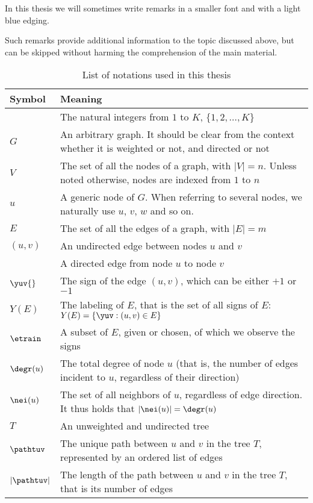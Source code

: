 In this thesis we will sometimes write remarks in a smaller font and with a light blue edging.
\begin{aside}
  Such remarks provide additional information to the topic discussed above, but can be skipped
  without harming the comprehension of the main material.
\end{aside}

\begin{table*}[thpb]
  \centering
  \caption{List of notations used in this thesis}\label{tab:notations}%
  \vspace{-.5\baselineskip}
  \begin{tabulary}{187mm}{LL}
    \toprule
    Symbol & Meaning \\
    \midrule
    \rangek{} & The natural integers from $1$ to $K$, \ie{} $\{1, 2, \ldots, K \}$ \\
    $G$ & An arbitrary graph. It should be clear from the context whether it is weighted or not, and directed or not \\
    $V$ & The set of all the nodes of a graph, with $|V|=n$. Unless noted otherwise, nodes are indexed from $1$ to $n$ \\
    $u$ & A generic node of $G$. When referring to several nodes, we naturally use $u$, $v$, $w$ and so on. \\
    $E$ & The set of all the edges of a graph, with $|E|=m$ \\
    $(u,v)$ & An undirected edge between nodes $u$ and $v$ \\
    \euv{} & A directed edge from node $u$ to node $v$ \\
    $\yuv{}$ & The sign of the edge $(u,v)$, which can be either $+1$ or $-1$ \\
    $Y(E)$ & The labeling of $E$, that is the set of all signs of $E$: $Y(E) = \{\yuv : (u,v)\in E\}$ \\
    $\etrain$ & A subset of $E$, given or chosen, of which we observe the signs \\
    $\degr(u)$ & The total degree of node $u$ (that is, the number of edges incident to $u$,
    regardless of their direction) \\
    $\nei(u)$ & The set of all neighbors of $u$, regardless of edge direction. It thus holds
    that $|\nei(u)| = \degr(u)$ \\
    $T$ & An unweighted and undirected tree \\
    $\pathtuv$ & The unique path between $u$ and $v$ in the tree $T$, represented by an ordered list of edges \\
    $|\pathtuv|$ & The length of the path between $u$ and $v$ in the tree $T$, that is its number of edges \\
    \bottomrule
  \end{tabulary}
\end{table*}
